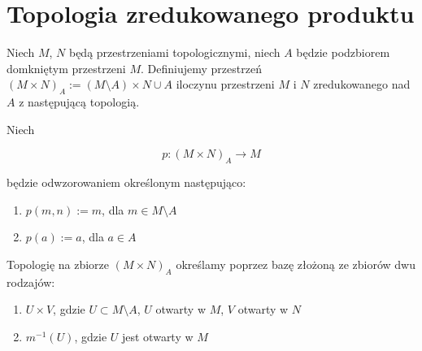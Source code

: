 \section{Topologia zredukowanego produktu}
\begin{df}
  Niech $M$, $N$ będą przestrzeniami topologicznymi, niech $A$ będzie podzbiorem domkniętym przestrzeni $M$. Definiujemy przestrzeń $(M \times N)_A := (M \setminus A) \times N \cup A$ iloczynu przestrzeni $M$ i $N$ zredukowanego nad $A$ z następującą topologią.
  
  Niech
  
  \[p: (M \times N)_A \rightarrow M\]
  
  będzie odwzorowaniem określonym następująco:
  \begin{enumerate}
   \item $p(m, n) := m$, dla $m \in M \setminus A$
   \item $p(a) := a$, dla $a \in A$
  \end{enumerate}
  
  Topologię na zbiorze $(M \times N)_A$ określamy poprzez bazę złożoną ze zbiorów dwu rodzajów:
  \begin{enumerate}
   \item $U \times V$, gdzie $U \subset M \setminus A$, $U$ otwarty w $M$, $V$ otwarty w $N$
   \item $m^{-1}(U)$, gdzie $U$ jest otwarty w $M$
  \end{enumerate}
\end{df}


